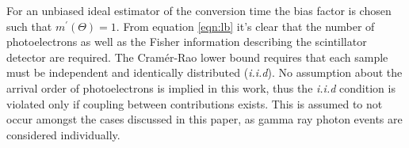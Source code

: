 
For an unbiased ideal estimator of the conversion time the bias factor is chosen such that ${m^\prime(\Theta)}= 1$. 
From equation \ref{eqn:lb} it's clear that the number of photoelectrons as well as the Fisher information describing the scintillator detector are required. 
The Cram\'{e}r-Rao lower bound requires that each sample must be independent and identically distributed (\textit{i.i.d})\cite{degroot2011probability}. 
No assumption about the arrival order of photoelectrons is implied in this work, thus the \textit{i.i.d} condition is violated only if coupling between contributions exists. This is assumed to not occur amongst the cases discussed in this paper, as gamma ray photon events are considered individually.